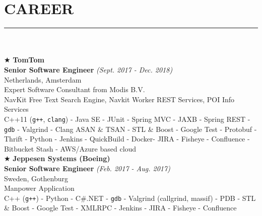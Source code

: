 \documentclass[10pt,a4paper]{article}
\begin{document}
\section{CAREER}
\noindent\rule {18.0cm}{0.2pt} \\ \\
$\bigstar$ \hspace{0.1cm} \large \textbf{TomTom} \\
\indent \small \textbf{Senior Software Engineer} \textsl{(Sept. 2017 - Dec. 2018)} \\
\indent \textnormal{Netherlands, Amsterdam} \\
\indent \textbullet \hspace{0.05cm} Expert Software Consultant from Modis B.V. \\
\indent \textbullet \hspace{0.05cm} NavKit Free Text Search Engine, Navkit Worker REST Services, POI Info Services \\
\indent \textbullet \hspace{0.05cm} C++11 (\texttt{g++}, \texttt{clang}) - Java SE - JUnit - Spring MVC - JAXB - Spring REST -  \texttt{gdb} - Valgrind - Clang ASAN \& TSAN - STL \& Boost - Google Test - Protobuf - Thrift - Python - Jenkins - QuickBuild - Docker- JIRA - Fisheye - Confluence - Bitbucket Stash - AWS/Azure based cloud \\

\noindent $\bigstar$ \hspace{0.1cm} \large \textbf{Jeppesen Systems (Boeing)} \\
\indent \small \textbf{Senior Software Engineer} \textsl{(Feb. 2017 - Aug. 2017)} \\
\indent \textnormal{Sweden, Gothenburg} \\
\indent \textbullet \hspace{0.05cm} Manpower Application \\
\indent \textbullet \hspace{0.05cm} C++ (\texttt{g++}) - Python - C\#.NET - \texttt{gdb} - Valgrind (callgrind, massif) - PDB - STL \& Boost - Google Test - XMLRPC - Jenkins - JIRA - Fisheye - Confluence

\break
\end{document}
